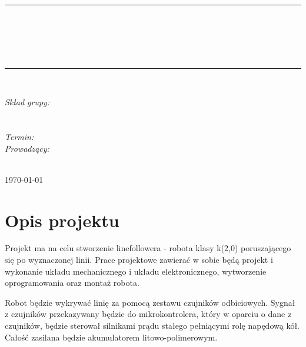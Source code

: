 \documentclass[10pt, a4paper]{article}
\begin{document}
\def\tablename{Tabela}	%

\begin{titlepage}
	\begin{center}
		\textsc{\LARGE \formakursu}\\[1cm]		
		\textsc{\Large \kurs}\\[0.5cm]		
		\rule{\textwidth}{0.08cm}\\[0.4cm]
		{\huge \bfseries \doctype}\\[1cm]
		{\huge \bfseries \projectname}\\[0.5cm]
		{\huge \bfseries \acronim}\\[0.4cm]
		\rule{\textwidth}{0.08cm}\\[1cm]
		
		\begin{flushright} \large
		\emph{Skład grupy:}\\
		\osobaA\\
		\osobaB\\[0.4cm]
		
		\emph{Termin: }\termin\\[0.4cm]

		\emph{Prowadzący:} \\
		\prowadzacy \\
		
		\end{flushright}
		
		\vfill
		
		{\large \today}
	\end{center}	
\end{titlepage}

\newpage
\tableofcontents
\newpage

\section{Opis projektu}
\label{sec:OpisProjektu}
Projekt ma na celu stworzenie linefollowera - robota klasy k(2,0) poruszającego się po wyznaczonej linii. Prace projektowe zawierać w sobie będą projekt i wykonanie układu mechanicznego i układu elektronicznego, wytworzenie oprogramowania oraz montaż robota.

Robot będzie wykrywać linię za pomocą zestawu czujników odbiciowych. Sygnał z czujników przekazywany będzie do mikrokontrolera, który w oparciu o dane z czujników, będzie sterował silnikami prądu stałego pełniącymi rolę napędową kół. Całość zasilana będzie akumulatorem litowo-polimerowym.
\end{document}
